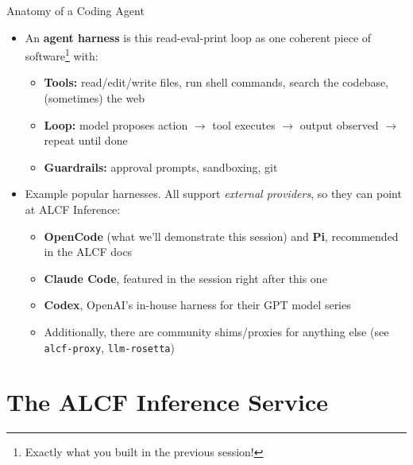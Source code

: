 \documentclass[10pt,aspectratio=169]{beamer}
\begin{document}
\begin{frame}{Anatomy of a Coding Agent}
  \begin{itemize}
    \item An \textbf{agent harness} is this read-eval-print loop as one
      coherent piece of software\footnote{Exactly what you built in the
      previous session!} with:
      \pause
    \begin{itemize}
      \item \textbf{Tools:} read/edit/write files, run shell commands, search
        the codebase, (sometimes) the web
        \pause
      \item \textbf{Loop:} model proposes action $\rightarrow$ tool executes
        $\rightarrow$ output observed $\rightarrow$ repeat until done
        \pause
      \item \textbf{Guardrails:} approval prompts, sandboxing, git
        \pause
    \end{itemize}
    \item Example popular harnesses. All support \emph{external providers}, so
      they can point at ALCF Inference:
    \begin{itemize}
      \item \textbf{OpenCode} (what we'll demonstrate this session) and
	      \textbf{Pi}, recommended in the ALCF docs
      \item \textbf{Claude Code}, featured in the session right after
        this one
      \item \textbf{Codex}, OpenAI's in-house harness for their GPT model series
        \pause
      \item Additionally, there are community shims/proxies for anything else
	      (see \texttt{alcf-proxy}, \texttt{llm-rosetta})
    \end{itemize}
  \end{itemize}
\end{frame}

\section{The ALCF Inference Service}
\end{document}

